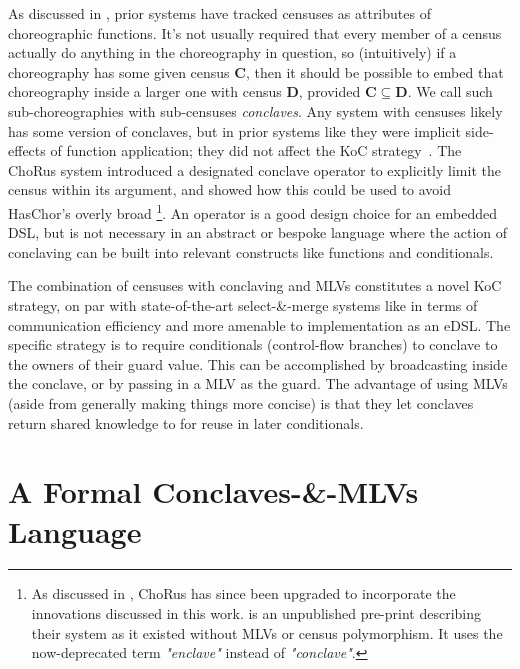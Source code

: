 As discussed in , prior systems have tracked censuses as attributes of choreographic functions.
It's not usually required that every member of a census actually do anything in the choreography in question,
so (intuitively) if a choreography has some given census $\mathbf{C}$,
then it should be possible to embed that choreography inside a larger one with census $\mathbf{D}$,
provided $\mathbf{C}\subseteq\mathbf{D}$.
We call such sub-choreographies with sub-censuses \emph{conclaves}.
Any system with censuses likely has some version of conclaves,
but in prior systems like \chorLambda they were implicit side-effects of function application;
they did not affect the KoC strategy~\cite{chor-lambda}.
The ChoRus system introduced a designated conclave operator to explicitly limit the census within its argument,
and showed how this could be used to avoid HasChor's overly broad \footnote{
	As discussed in \cite{batesenclaves}, ChoRus has since been upgraded to incorporate
	the innovations discussed in this work.
	\cite{chorus} is an unpublished pre-print describing their system as it existed without MLVs or census polymorphism.
  It uses the now-deprecated term \emph{"enclave"} instead of \emph{"conclave"}.
}.
An  operator is a good design choice for an embedded DSL,
but is not necessary in an abstract or bespoke language where the action of conclaving can be built into relevant constructs like
functions and conditionals.

The combination of censuses with conclaving and MLVs constitutes a novel KoC strategy,
on par with state-of-the-art select-\&-merge systems like \chorLambda in terms of communication efficiency
and more amenable to implementation as an eDSL.
The specific strategy is to require conditionals (control-flow branches) to conclave to the owners of their guard value.
This can be accomplished by broadcasting inside the conclave, or by passing in a MLV as the guard.
The advantage of using MLVs (aside from generally making things more concise)
is that they let conclaves return shared knowledge to for reuse in later conditionals.


\section{A Formal Conclaves-\&-MLVs Language}\label{sec:more-formalism}

